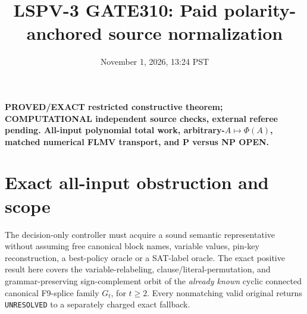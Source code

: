 \documentclass[11pt]{article}
\title{LSPV-3 GATE310: Paid polarity-anchored source normalization}
\date{November 1, 2026, 13:24 PST}
\begin{document}
\maketitle
\noindent\textbf{PROVED/EXACT restricted constructive theorem; COMPUTATIONAL independent source checks, external referee pending. All-input polynomial total work, arbitrary-$A\mapsto\Phi(A)$, matched numerical FLMV transport, and P versus NP OPEN.}
\section{Exact all-input obstruction and scope}
The decision-only controller must acquire a sound semantic representative without assuming free canonical block names, variable values, pin-key reconstruction, a best-policy oracle or a SAT-label oracle. The exact positive result here covers the variable-relabeling, clause/literal-permutation, and grammar-preserving sign-complement orbit of the \emph{already known} cyclic connected canonical F9-splice family $G_t$, for $t\ge2$. Every nonmatching valid original returns \texttt{UNRESOLVED} to a separately charged exact fallback.
\end{document}
